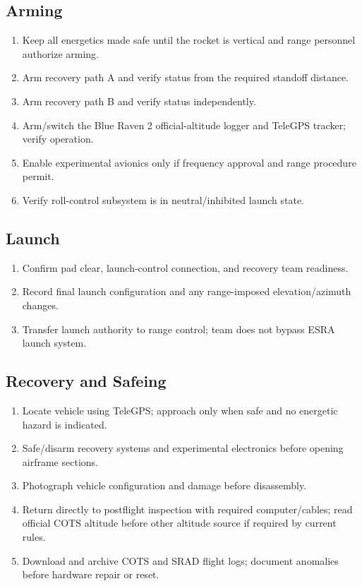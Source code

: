 \documentclass[10pt]{article}
\begin{document}
\subsection{Arming}
\begin{enumerate}
\item Keep all energetics made safe until the rocket is vertical and range personnel authorize arming.
\item Arm recovery path A and verify status from the required standoff distance.
\item Arm recovery path B and verify status independently.
\item Arm/switch the Blue Raven 2 official-altitude logger and TeleGPS tracker; verify operation.
\item Enable experimental avionics only if frequency approval and range procedure permit.
\item Verify roll-control subsystem is in neutral/inhibited launch state.
\end{enumerate}

\subsection{Launch}
\begin{enumerate}
\item Confirm pad clear, launch-control connection, and recovery team readiness.
\item Record final launch configuration and any range-imposed elevation/azimuth changes.
\item Transfer launch authority to range control; team does not bypass ESRA launch system.
\end{enumerate}

\subsection{Recovery and Safeing}
\begin{enumerate}
\item Locate vehicle using TeleGPS; approach only when safe and no energetic hazard is indicated.
\item Safe/disarm recovery systems and experimental electronics before opening airframe sections.
\item Photograph vehicle configuration and damage before disassembly.
\item Return directly to postflight inspection with required computer/cables; read official COTS altitude before other altitude source if required by current rules.
\item Download and archive COTS and SRAD flight logs; document anomalies before hardware repair or reset.
\end{enumerate}
\end{document}
